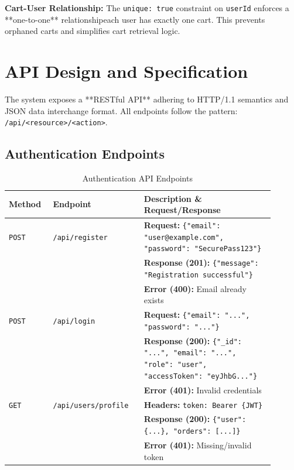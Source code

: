 \documentclass[12pt, a4paper]{report}
\begin{document}
\textbf{Cart-User Relationship:} The \texttt{unique: true} constraint on \texttt{userId} enforces a **one-to-one** relationshipeach user has exactly one cart. This prevents orphaned carts and simplifies cart retrieval logic.

\section{API Design and Specification}

The system exposes a **RESTful API** adhering to HTTP/1.1 semantics and JSON data interchange format. All endpoints follow the pattern: \texttt{/api/<resource>/<action>}.

\subsection{Authentication Endpoints}

\begin{table}[H]
\centering
\caption{Authentication API Endpoints}
\label{tab:api_auth}
\small
\begin{tabular}{@{}p{0.15\linewidth}p{0.30\linewidth}p{0.45\linewidth}@{}}
\toprule
\textbf{Method} & \textbf{Endpoint} & \textbf{Description \& Request/Response} \\
\midrule
\texttt{POST} & \texttt{/api/register} & 
\textbf{Request:} \texttt{\{"email": "user@example.com", "password": "SecurePass123"\}} \\
& & \textbf{Response (201):} \texttt{\{"message": "Registration successful"\}} \\
& & \textbf{Error (400):} Email already exists \\
\midrule
\texttt{POST} & \texttt{/api/login} & 
\textbf{Request:} \texttt{\{"email": "...", "password": "..."\}} \\
& & \textbf{Response (200):} \texttt{\{"\_id": "...", "email": "...", "role": "user", "accessToken": "eyJhbG..."\}} \\
& & \textbf{Error (401):} Invalid credentials \\
\midrule
\texttt{GET} & \texttt{/api/users/profile} & 
\textbf{Headers:} \texttt{token: Bearer \{JWT\}} \\
& & \textbf{Response (200):} \texttt{\{"user": \{...\}, "orders": [...]\}} \\
& & \textbf{Error (401):} Missing/invalid token \\
\bottomrule
\end{tabular}
\end{table}
\end{document}
